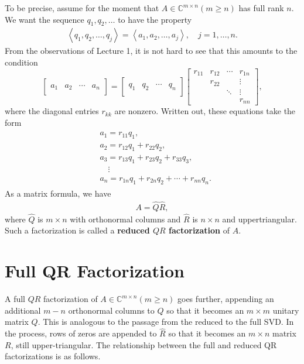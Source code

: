 To be precise, assume for the moment that $A \in \mathbb{C}^{m \times n}(m \geq n)$ has full rank $n$. We want the sequence $q_1, q_2, \ldots$ to have the property
\begin{align*}
\left\langle q_1, q_2, \ldots, q_j\right\rangle=\left\langle a_1, a_2, \ldots, a_j\right\rangle, \quad j=1, \ldots, n .
\end{align*}
From the observations of Lecture 1, it is not hard to see that this amounts to the condition 
\[
    \left[\begin{array}{l|l|l|l}
        & &\\ 
        a_1 & a_2 & \cdots & a_n \\
        & &
        \end{array}\right]=\left[\begin{array}{l|l|l|l} 
        & & & \\
        q_1 & q_2 & \cdots & q_n\\ 
        & & & 
        \end{array}\right]\left[\begin{array}{cccc}
        r_{11} & r_{12} & \cdots & r_{1 n} \\
        & r_{22} & & \vdots \\
        & & \ddots & \vdots \\
        & & & r_{n n}
        \end{array}\right],
\]
where the diagonal entries $r_{kk}$ are nonzero. Written out, these equations take the form
\begin{align*}
\begin{aligned}
& a_1=r_{11} q_1, \\
& a_2=r_{12} q_1+r_{22} q_2, \\
& a_3=r_{13} q_1+r_{23} q_2+r_{33} q_3, \\
& \quad \vdots \\
& a_n=r_{1 n} q_1+r_{2 n} q_2+\cdots+r_{n n} q_n .
\end{aligned}
\end{align*}
As a matrix formula, we have
\begin{align*}
A=\hat{Q} \hat{R},
\end{align*}
where $\hat{Q}$ is $m \times n$ with orthonormal columns and $\hat{R}$ is $n \times n$ and uppertriangular. Such a factorization is called a \textbf{reduced $Q R$ factorization} of $A$.

\section{Full QR Factorization}
A full $Q R$ factorization of $A \in \mathbb{C}^{m \times n}(m \geq n)$ goes further, appending an additional $m-n$ orthonormal columns to $\hat{Q}$ so that it becomes an $m \times m$ unitary matrix $Q$. This is analogous to the passage from the reduced to the full SVD. In the process, rows of zeros are appended to $\hat{R}$ so that it becomes an $m \times n$ matrix $R$, still upper-triangular. The relationship between the full and reduced QR factorizations is as follows.

